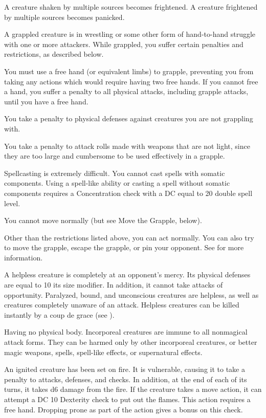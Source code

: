 A creature shaken by multiple sources becomes frightened. A creature frightened by multiple sources becomes panicked.

 A grappled creature is in wrestling or some other form of hand-to-hand struggle with one or more attackers. While grappled, you suffer certain penalties and restrictions, as described below.

\begin{itemize*}
    \item You must use a free hand (or equivalent limbs) to grapple, preventing you from taking any actions which would require having two free hands. If you cannot free a hand, you suffer a  penalty to all physical attacks, including grapple attacks, until you have a free hand.
    \item You take a  penalty to physical defenses against creatures you are not grappling with.
    \item You take a  penalty to attack rolls made with weapons that are not light, since they are too large and cumbersome to be used effectively in a grapple.
    \item Spellcasting is extremely difficult. You cannot cast spells with somatic components. Using a spell-like ability or casting a spell without somatic components requires a Concentration check with a DC equal to 20 \add double spell level.
    \item You cannot move normally (but see Move the Grapple, below).
\end{itemize*}

Other than the restrictions listed above, you can act normally. You can also try to move the grapple, escape the grapple, or pin your opponent. See  for more information.

 A helpless creature is completely at an opponent's mercy. Its physical defenses are equal to 10 \add its size modifier. In addition, it cannot take attacks of opportunity. Paralyzed, bound, and unconscious creatures are helpless, as well as creatures completely unaware of an attack. Helpless creatures can be killed instantly by a coup de grace (see ).

 Having no physical body. Incorporeal creatures are immune to all nonmagical attack forms. They can be harmed only by other incorporeal creatures,  or better magic weapons, spells, spell-like effects, or supernatural effects.

 An ignited creature has been set on fire. It is vulnerable, causing it to take a  penalty to attacks, defenses, and checks. In addition, at the end of each of its turns, it takes d6 damage from the fire. If the creature takes a move action, it can attempt a DC 10 Dexterity check to put out the flames. This action requires a free hand. Dropping prone as part of the action gives a  bonus on this check.

